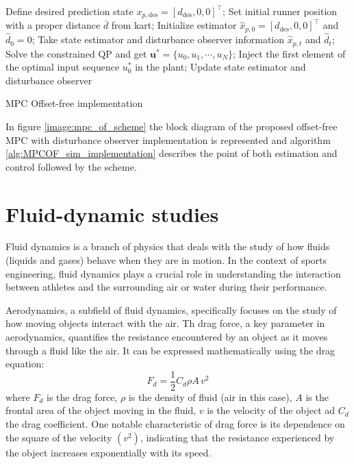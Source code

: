 \documentclass[a4paper,12pt,oneside]{book}
\begin{document}
\begin{algorithm}
\begin{algorithmic}[1]
	\State Define desired prediction state $x_{p,\text{des}} = [d_{\text{des}}, 0, 0]^\top$;
	\State Set initial runner position with a proper distance $\bar{d}$ from kart;
	\State Initialize estimator $\hat{x}_{p,0} = [d_{\text{des}}, 0, 0]^\top$ and $\hat{d}_0 = 0$;
		\State Take state estimator and disturbance observer information $\hat{x}_{p,t}$ and $\hat{d}_t$;
		\State Solve the constrained QP and get $\boldsymbol{u}^* = \{u_0, u_1, \cdots, u_N\}$; 
		\State Inject the first element of the optimal input sequence $u_0^*$ in the plant;
		\State Update state estimator and disturbance observer 
	\EndFor
\caption{MPC Offset-free implementation}
\label{alg:MPCOF_sim_implementation}
\end{algorithmic}
\end{algorithm}

\bigskip
In figure \ref{image:mpc_of_scheme} the block diagram of the proposed offset-free MPC with disturbance observer implementation is represented and algorithm \ref{alg:MPCOF_sim_implementation} describes the point of both estimation and control followed by the scheme.

\newpage
\section{Fluid-dynamic studies}

Fluid dynamics is a branch of physics that deals with the study of how fluids (liquids and gases) behave when they are in motion.
In the context of sports engineering, fluid dynamics plays a crucial role in understanding the interaction between athletes and the surrounding air or water during their performance.

Aerodynamics, a subfield of fluid dynamics, specifically focuses on the study of how moving objects interact with the air. 
Th drag force, a key parameter in aerodynamics, quantifies the resistance encountered by an object as it moves through a fluid like the air. 
It can be expressed mathematically using the drag equation:
\begin{equation}
	F_d = \frac{1}{2} C_d \rho A \, v^2
\end{equation}
where $F_d$ is the drag force, $\rho$ is the density of fluid (air in this case), $A$ is the frontal area of the object moving in the fluid, 
$v$ is the velocity of the object ad $C_d$ the drag coefficient.
One notable characteristic of drag force is its dependence on the square of the velocity $(v^2)$, indicating that the resistance experienced by the object increases exponentially with its speed. 
\end{document}
